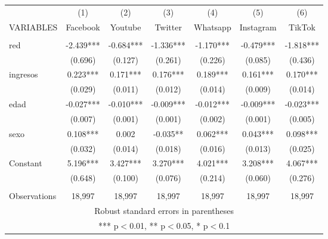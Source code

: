 \begin{tabular}{lcccccc} \hline
 & (1) & (2) & (3) & (4) & (5) & (6) \\
VARIABLES & Facebook & Youtube & Twitter & Whatsapp & Instagram & TikTok \\ \hline
 &  &  &  &  &  &  \\
red & -2.439*** & -0.684*** & -1.336*** & -1.170*** & -0.479*** & -1.818*** \\
 & (0.696) & (0.127) & (0.261) & (0.226) & (0.085) & (0.436) \\
ingresos & 0.223*** & 0.171*** & 0.176*** & 0.189*** & 0.161*** & 0.170*** \\
 & (0.029) & (0.011) & (0.012) & (0.014) & (0.009) & (0.014) \\
edad & -0.027*** & -0.010*** & -0.009*** & -0.012*** & -0.009*** & -0.023*** \\
 & (0.007) & (0.001) & (0.001) & (0.002) & (0.001) & (0.005) \\
sexo & 0.108*** & 0.002 & -0.035** & 0.062*** & 0.043*** & 0.098*** \\
 & (0.032) & (0.014) & (0.018) & (0.016) & (0.013) & (0.025) \\
Constant & 5.196*** & 3.427*** & 3.270*** & 4.021*** & 3.208*** & 4.067*** \\
 & (0.648) & (0.100) & (0.076) & (0.214) & (0.060) & (0.276) \\
 &  &  &  &  &  &  \\
 Observations & 18,997 & 18,997 & 18,997 & 18,997 & 18,997 & 18,997 \\ \hline
\multicolumn{7}{c}{ Robust standard errors in parentheses} \\
\multicolumn{7}{c}{ *** p$<$0.01, ** p$<$0.05, * p$<$0.1} \\
\end{tabular}
